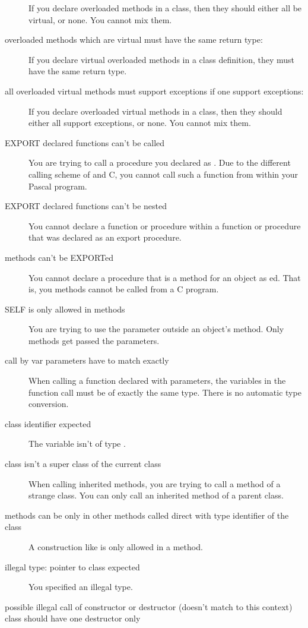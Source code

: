 \documentclass{report}
\begin{document}
\begin{description}
If you declare overloaded methods in a class, then they should either all be
virtual, or none. You cannot mix them.
\item [overloaded methods which are virtual must have the same return type:]
If you declare virtual overloaded methods in a class definition, they must
have the same return type.
\item [all overloaded virtual methods must support exceptions if one support exceptions:]
If you declare overloaded virtual methods in a class, then they should either 
all support exceptions, or none. You cannot mix them.
\item [EXPORT declared functions can't be called]
You are trying to call a procedure you declared as . Due to the
different calling scheme of \fpc and C, you cannot call such a function from
within your Pascal program. 
\item [EXPORT declared functions can't be nested]
You cannot declare a function or procedure within a function or procedure
that was declared as an export procedure.
\item [methods can't be EXPORTed]
You cannot declare a procedure that is a method for an object as
ed. That is, you methods cannot be called from a C program.
\item [SELF is only allowed in methods]
You are trying to use the  parameter outside an object's method.
Only methods get passed the  parameters.
\item [call by var parameters have to match exactly]
When calling a function declared with  parameters, the variables in
the function call must be of exactly the same type. There is no automatic
type conversion. 
\item [class identifier expected]
The variable isn't of type .
\item [class isn't a super class of the current class]
When calling inherited methods, you are trying to call a method of a strange
class. You can only call an inherited method of a parent class.
\item [methods can be only in other methods called direct with type identifier of the class]
A construction like  is only allowed in a method.
\item [illegal type: pointer to class expected]
You specified an illegal type.
\item [possible illegal call of constructor or destructor (doesn't match to this context)]
\item [class should have one destructor only]

\end{description}
\end{document}

